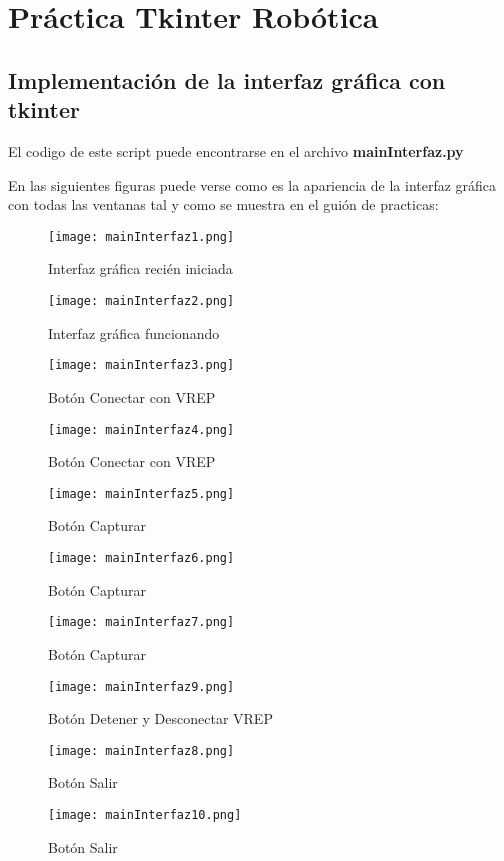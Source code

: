 \chapter{Práctica Tkinter Robótica}

\section{Implementación de la interfaz gráfica con tkinter}

El codigo de este script puede encontrarse en el archivo \textbf{mainInterfaz.py}

En las siguientes figuras puede verse como es la apariencia de la interfaz gráfica con todas las ventanas tal y como se muestra en el guión de practicas:

\begin{figure}[H]
	\centering
	\texttt{[image: mainInterfaz1.png]}
	\caption{Interfaz gráfica recién iniciada}
\end{figure}
\begin{figure}[H]
	\centering
	\texttt{[image: mainInterfaz2.png]}
	\caption{Interfaz gráfica funcionando}
\end{figure}
\begin{figure}[H]
	\centering
	\texttt{[image: mainInterfaz3.png]}
	\caption{Botón Conectar con VREP}
\end{figure}
\begin{figure}[H]
	\centering
	\texttt{[image: mainInterfaz4.png]}
	\caption{Botón Conectar con VREP}
\end{figure}
\begin{figure}[H]
	\centering
	\texttt{[image: mainInterfaz5.png]}
	\caption{Botón Capturar}
\end{figure}
\begin{figure}[H]
	\centering
	\texttt{[image: mainInterfaz6.png]}
	\caption{Botón Capturar}
\end{figure}
\begin{figure}[H]
	\centering
	\texttt{[image: mainInterfaz7.png]}
	\caption{Botón Capturar}
\end{figure}
\begin{figure}[H]
	\centering
	\texttt{[image: mainInterfaz9.png]}
	\caption{Botón Detener y Desconectar VREP}
\end{figure}
\begin{figure}[H]
	\centering
	\texttt{[image: mainInterfaz8.png]}
	\caption{Botón Salir}
\end{figure}
\begin{figure}[H]
	\centering
	\texttt{[image: mainInterfaz10.png]}
	\caption{Botón Salir}
\end{figure}

